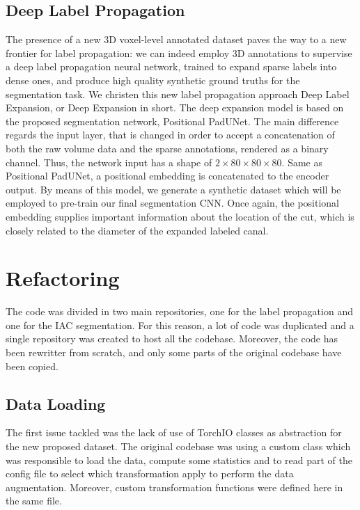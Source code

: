 \subsection{Deep Label Propagation}
The presence of a new 3D voxel-level annotated dataset paves the way to a new
frontier for label propagation: we can indeed employ 3D annotations to supervise
a deep label propagation neural network, trained to expand sparse labels into
dense ones, and produce high quality synthetic ground truths for the
segmentation task. We christen this new label propagation approach Deep Label
Expansion, or Deep Expansion in short. The deep expansion model is based on the
proposed segmentation network, Positional PadUNet. The main difference regards
the input layer, that is changed in order to accept a concatenation of both the
raw volume data and the sparse annotations, rendered as a binary channel. Thus,
the network input has a shape of $2 \times 80 \times 80 \times 80$. Same as
Positional PadUNet, a positional embedding is concatenated to the encoder
output. By means of this model, we generate a synthetic dataset which will be
employed to pre-train our final segmentation CNN. Once again, the positional
embedding supplies important information about the location of the cut, which is
closely related to the diameter of the expanded labeled canal.

\section{Refactoring}
The code was divided in two main repositories, one for the label propagation and
one for the IAC segmentation. For this reason, a lot of code was duplicated and
a single repository was created to host all the codebase. Moreover, the code has been
rewritter from scratch, and only some parts of the original codebase have been
copied.

\subsection{Data Loading}
The first issue tackled was the lack of use of TorchIO classes as abstraction
for the new proposed dataset. The original codebase was using a custom class which
was responsible to load the data, compute some statistics and to read part of
the config file to select which transformation apply to perform the data
augmentation. Moreover, custom transformation functions were defined here in the
same file.

